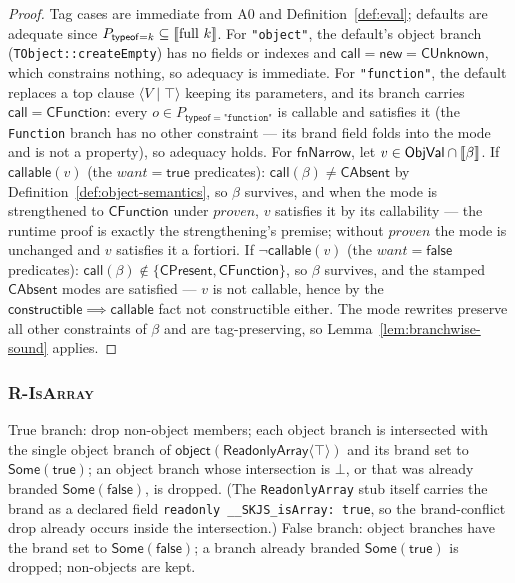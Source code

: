 \documentclass[11pt]{article}
\newcommand{\ObjVal}{\mathsf{ObjVal}}
\newcommand{\clause}[2]{\langle #1 \mid #2 \rangle}
\begin{document}
\begin{lemma}
\label{lem:r-typeof-sound}
\end{lemma}
\begin{proof}
Tag cases are immediate from A0 and Definition~\ref{def:eval}; defaults are
adequate since $P_{\mathsf{typeof}=k} \subseteq \llbracket \mathrm{full}\ k \rrbracket$. For
\texttt{"object"}, the default's object branch (\texttt{TObject::createEmpty})
has no fields or indexes and
$\mathsf{call} = \mathsf{new} = \mathsf{CUnknown}$, which constrains
nothing, so adequacy is immediate. For \texttt{"function"}, the default
replaces a top clause $\clause{V}{\top}$ keeping its parameters, and its
branch carries $\mathsf{call} = \mathsf{CFunction}$: every
$o \in P_{\mathsf{typeof}=\texttt{"function"}}$ is callable and satisfies
it (the \texttt{Function} branch has no other constraint — its brand
field folds into the mode and is not a property), so adequacy holds.
For $\mathsf{fnNarrow}$, let $v \in \ObjVal \cap \sem{\beta}$.
If $\mathsf{callable}(v)$ (the $\mathit{want} = \mathsf{true}$ predicates):
$\mathsf{call}(\beta) \neq \mathsf{CAbsent}$ by
Definition~\ref{def:object-semantics}, so $\beta$ survives, and when the
mode is strengthened to $\mathsf{CFunction}$ under $\mathit{proven}$, $v$
satisfies it by its callability — the runtime proof is exactly the
strengthening's premise; without $\mathit{proven}$ the mode is unchanged
and $v$ satisfies it a fortiori. If $\neg\mathsf{callable}(v)$
(the $\mathit{want} = \mathsf{false}$ predicates):
$\mathsf{call}(\beta) \notin \{\mathsf{CPresent}, \mathsf{CFunction}\}$,
so $\beta$ survives, and the stamped $\mathsf{CAbsent}$ modes are
satisfied — $v$ is not callable, hence by the
$\mathsf{constructible} \implies \mathsf{callable}$ fact not
constructible either. The mode rewrites preserve all other constraints
of $\beta$ and are tag-preserving, so
Lemma~\ref{lem:branchwise-sound} applies.
\end{proof}

\subsubsection{\textsc{R-IsArray}}
\label{sec:r-isarray}

True branch: drop non-object members; each object branch is intersected with
the single object branch of $\mathsf{object}(\mathsf{ReadonlyArray}\langle\top\rangle)$ and
its brand set to $\mathsf{Some}(\mathsf{true})$; an object branch whose intersection
is $\bot$, or that was already branded $\mathsf{Some}(\mathsf{false})$, is
dropped. (The \texttt{ReadonlyArray} stub itself carries the brand as a
declared field \texttt{readonly \_\_SKJS\_isArray:\ true}, so the
brand-conflict drop already occurs inside the intersection.) False branch:
object branches have the brand set to $\mathsf{Some}(\mathsf{false})$; a
branch already branded $\mathsf{Some}(\mathsf{true})$ is dropped;
non-objects are kept.
\end{document}

